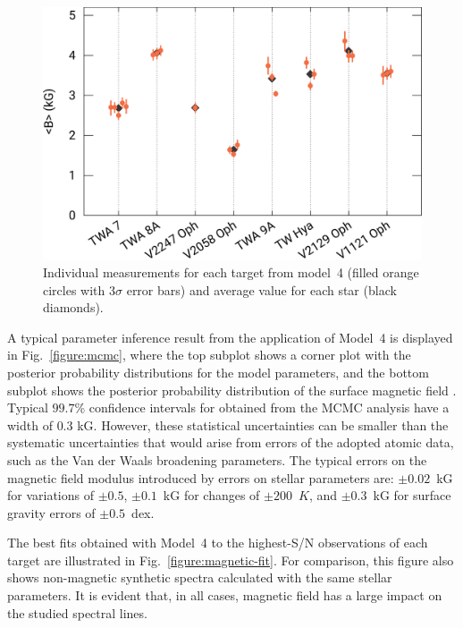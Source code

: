 \documentclass{aa}
\begin{document}
\begin{figure}
\centering
\includegraphics[width=1.0\columnwidth]{rot-error.eps}
\caption{
    Individual {\bb} measurements for each target from model~4 (filled orange circles with $3\sigma$ error bars) and average {\bb} value for each star (black diamonds).
}
\label{figure:rot}
\end{figure}

A typical parameter inference result from the application of Model~4 is displayed in Fig.~\ref{figure:mcmc}, where the top subplot shows a corner plot with the posterior probability distributions for the model parameters, and the bottom subplot shows the posterior probability distribution of the surface magnetic field {\bb}. Typical $99.7$\% confidence intervals for {\bb} obtained from the MCMC analysis have a width of $0.3$ kG. However, these statistical uncertainties can be smaller than the systematic uncertainties that would arise from errors of the adopted atomic data, such as the Van der Waals broadening parameters. The typical errors on the magnetic field modulus introduced by errors on stellar parameters are: $\pm 0.02$~kG for {\vsini} variations of $\pm 0.5${\kms}, $\pm 0.1$~kG for {\teff} changes of $\pm 200$~$K$, and $\pm 0.3$~kG for surface gravity errors of $\pm 0.5$~dex.

The best fits obtained with Model~4 to the highest-S/N observations of each target are illustrated in Fig.~\ref{figure:magnetic-fit}. For comparison, this figure also shows non-magnetic synthetic spectra calculated with the same stellar parameters. It is evident that, in all cases, magnetic field has a large impact on the studied spectral lines.
\end{document}
